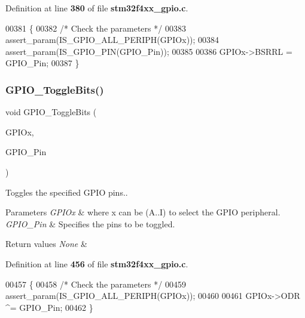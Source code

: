 Definition at line \textbf{ 380} of file \textbf{ stm32f4xx\+\_\+gpio.\+c}.


\begin{DoxyCode}
00381 \{
00382   \textcolor{comment}{/* Check the parameters */}
00383   assert_param(IS_GPIO_ALL_PERIPH(GPIOx));
00384   assert_param(IS_GPIO_PIN(GPIO\_Pin));
00385 
00386   GPIOx->BSRRL = GPIO\_Pin;
00387 \}
\end{DoxyCode}
\mbox{\label{group__GPIO__Group2_gac1b837c66258872740d5f89f23549ab1}} 
\subsubsection{G\+P\+I\+O\+\_\+\+Toggle\+Bits()}
{\footnotesize\ttfamily void G\+P\+I\+O\+\_\+\+Toggle\+Bits (\begin{DoxyParamCaption}\item[{\textbf{ G\+P\+I\+O\+\_\+\+Type\+Def} $\ast$}]{G\+P\+I\+Ox,  }\item[{uint16\+\_\+t}]{G\+P\+I\+O\+\_\+\+Pin }\end{DoxyParamCaption})}



Toggles the specified G\+P\+IO pins.. 


\begin{DoxyParams}{Parameters}
{\em G\+P\+I\+Ox} & where x can be (A..I) to select the G\+P\+IO peripheral. \\
\hline
{\em G\+P\+I\+O\+\_\+\+Pin} & Specifies the pins to be toggled. \\
\hline
\end{DoxyParams}

\begin{DoxyRetVals}{Return values}
{\em None} & \\
\hline
\end{DoxyRetVals}


Definition at line \textbf{ 456} of file \textbf{ stm32f4xx\+\_\+gpio.\+c}.


\begin{DoxyCode}
00457 \{
00458   \textcolor{comment}{/* Check the parameters */}
00459   assert_param(IS_GPIO_ALL_PERIPH(GPIOx));
00460 
00461   GPIOx->ODR ^= GPIO\_Pin;
00462 \}
\end{DoxyCode}
\mbox{\label{group__GPIO__Group2_gaa925f19c8547a00c7a0c269a84873bf9}} 
